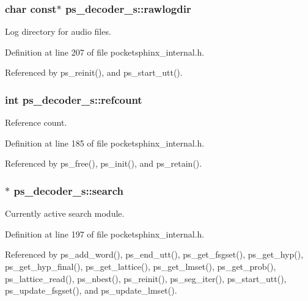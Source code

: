 \subsubsection[{rawlogdir}]{\setlength{\rightskip}{0pt plus 5cm}char const$\ast$ {\bf ps\-\_\-decoder\-\_\-s\-::rawlogdir}}\label{structps__decoder__s_aa2610c52a9267ee18ca095169bf34bfd}


\-Log directory for audio files. 



\-Definition at line 207 of file pocketsphinx\-\_\-internal.\-h.



\-Referenced by ps\-\_\-reinit(), and ps\-\_\-start\-\_\-utt().

\subsubsection[{refcount}]{\setlength{\rightskip}{0pt plus 5cm}int {\bf ps\-\_\-decoder\-\_\-s\-::refcount}}\label{structps__decoder__s_aa5ab90180288b6c9039eb86b496f76aa}


\-Reference count. 



\-Definition at line 185 of file pocketsphinx\-\_\-internal.\-h.



\-Referenced by ps\-\_\-free(), ps\-\_\-init(), and ps\-\_\-retain().

\subsubsection[{search}]{$\ast$ {\bf ps\-\_\-decoder\-\_\-s\-::search}}\label{structps__decoder__s_ad337270efc93613cf8dd7594f6515799}


\-Currently active search module. 



\-Definition at line 197 of file pocketsphinx\-\_\-internal.\-h.



\-Referenced by ps\-\_\-add\-\_\-word(), ps\-\_\-end\-\_\-utt(), ps\-\_\-get\-\_\-fsgset(), ps\-\_\-get\-\_\-hyp(), ps\-\_\-get\-\_\-hyp\-\_\-final(), ps\-\_\-get\-\_\-lattice(), ps\-\_\-get\-\_\-lmset(), ps\-\_\-get\-\_\-prob(), ps\-\_\-lattice\-\_\-read(), ps\-\_\-nbest(), ps\-\_\-reinit(), ps\-\_\-seg\-\_\-iter(), ps\-\_\-start\-\_\-utt(), ps\-\_\-update\-\_\-fsgset(), and ps\-\_\-update\-\_\-lmset().


